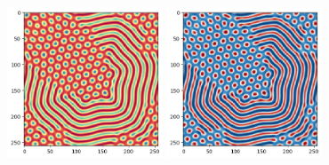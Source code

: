 \begin{center}
\includegraphics[height=4.5cm]{python_codes/fieldstone_171/results/delta2_solution_final_u.png}
\includegraphics[height=4.5cm]{python_codes/fieldstone_171/results/delta2_solution_final_v.png}
\end{center}

